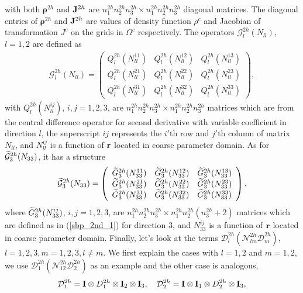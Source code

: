 with both ${\bm \rho}^{2h}$ and ${\bf J}^{2h}$ are $n_1^{2h}n_2^{2h}n_3^{2h}\times n_1^{2h}n_2^{2h}n_3^{2h}$ diagonal matrices. The diagonal entries of ${\bm \rho}^{2h}$ and ${\bf J}^{2h}$ are values of density function $\rho^c$ and Jacobian of transformation $J^c$ on the grids in $\Omega^c$ respectively.
The operators $\mathcal{G}_l^{2h}({N}_{ll})$, $l=1,2$ are defined as
\begin{align}\label{g1122}
\mathcal{G}^{2h}_l({N}_{ll}) = \left(\begin{array}{ccc}
Q_l^{2h}(N_{ll}^{11}) & Q_l^{2h}(N_{ll}^{12})  & Q_l^{2h}(N_{ll}^{13}) \\
Q_l^{2h}(N_{ll}^{21}) & Q_l^{2h}(N_{ll}^{22})  & Q_l^{2h}(N_{ll}^{23}) \\
Q_l^{2h}(N_{ll}^{31}) & Q_l^{2h}(N_{ll}^{32})  & Q_l^{2h}(N_{ll}^{33}) \end{array}\right),
\end{align}
with $Q_l^{2h}(N_{ll}^{ij})$, $i,j = 1,2,3$, are $n_1^{2h}n_2^{2h}n_3^{2h}\times n_1^{2h}n_2^{2h}n_3^{2h}$ matrices which are from the central difference operator for second derivative with variable coefficient in direction $l$, the superscript $ij$ represents the $i'$th row and $j'$th column of matrix $N_{ll}$, and $N^{ij}_{ll}$ is a function of ${\bf r}$ located in coarse parameter domain. As for $\widetilde{\mathcal{G}}_3^{2h}({N}_{33})$, it has a structure
\[ \widetilde{\mathcal{G}}^{2h}_3({N}_{33}) = \left(\begin{array}{ccc}
\widetilde{G}_3^{2h}(N_{33}^{11}) & \widetilde{G}_3^{2h}(N_{33}^{12})  & \widetilde{G}_3^{2h}(N_{33}^{13}) \\
\widetilde{G}_3^{2h}(N_{33}^{21}) & \widetilde{G}_3^{2h}(N_{33}^{22})  & \widetilde{G}_3^{2h}(N_{33}^{23}) \\
\widetilde{G}_3^{2h}(N_{33}^{31}) & \widetilde{G}_3^{2h}(N_{33}^{32})  & \widetilde{G}_3^{2h}(N_{33}^{33}) \end{array}\right),\]
where $\widetilde{G}_3^{2h}(N_{33}^{ij})$, $i,j = 1,2,3$, are $n_1^{2h}n_2^{2h}n_3^{2h}\times n_1^{2h}n_2^{2h}(n_3^{2h}+2)$ matrices which are defined as in (\ref{sbp_2nd_1}) for direction $3$, and $N_{33}^{ij}$ is a function of ${\bf r}$ located in coarse parameter domain. Finally, let's look at the terms $\mathcal{D}_l^{2h}(\mathcal{N}_{lm}^{2h}\mathcal{D}_m^{2h})$, $l = 1,2,3, m = 1,2,3, l\neq m$. We first explain the cases with $l = 1,2$ and $m = 1,2$, we use $\mathcal{D}_1^{2h}(\mathcal{N}_{12}^{2h}\mathcal{D}_2^{2h})$ as an example and the other case is analogous,
\begin{equation}\label{D12}
\mathcal{D}_1^{2h} = {\bf I}\otimes D_1^{2h} \otimes {\bf I}_2 \otimes {\bf I}_3,\ \ \ \mathcal{D}_2^{2h} ={\bf I}\otimes {\bf I}_1\otimes D_2^{2h}\otimes {\bf I}_3,
\end{equation}
